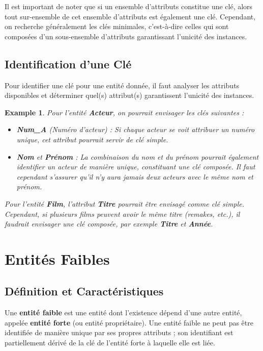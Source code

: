 \documentclass{article}
\newtheorem{example}{Example}
\begin{document}
Il est important de noter que si un ensemble d'attributs constitue une clé, alors tout sur-ensemble de cet ensemble d'attributs est également une clé.  Cependant, on recherche généralement les clés minimales, c'est-à-dire celles qui sont composées d'un sous-ensemble d'attributs garantissant l'unicité des instances.

\subsection{Identification d'une Clé}

Pour identifier une clé pour une entité donnée, il faut analyser les attributs disponibles et déterminer quel(s) attribut(s) garantissent l'unicité des instances.

\begin{example}
    Pour l'entité \textbf{Acteur}, on pourrait envisager les clés suivantes :
    \begin{itemize}
        \item \textbf{Num\_A} (Numéro d'acteur) : Si chaque acteur se voit attribuer un numéro unique, cet attribut pourrait servir de clé simple.
        \item \textbf{Nom} et \textbf{Prénom} :  La combinaison du nom et du prénom pourrait également identifier un acteur de manière unique, constituant une clé composée.  Il faut cependant s'assurer qu'il n'y aura jamais deux acteurs avec le même nom et prénom.
    \end{itemize}
    Pour l'entité \textbf{Film}, l'attribut \textbf{Titre} pourrait être envisagé comme clé simple.  Cependant, si plusieurs films peuvent avoir le même titre (remakes, etc.), il faudrait envisager une clé composée, par exemple \textbf{Titre} et \textbf{Année}.
\end{example}


\section{Entités Faibles}

\subsection{Définition et Caractéristiques}

Une \textbf{entité faible} est une entité dont l'existence dépend d'une autre entité, appelée \textbf{entité forte} (ou entité propriétaire).  Une entité faible ne peut pas être identifiée de manière unique par ses propres attributs ; son identifiant est partiellement dérivé de la clé de l'entité forte à laquelle elle est liée.
\end{document}
